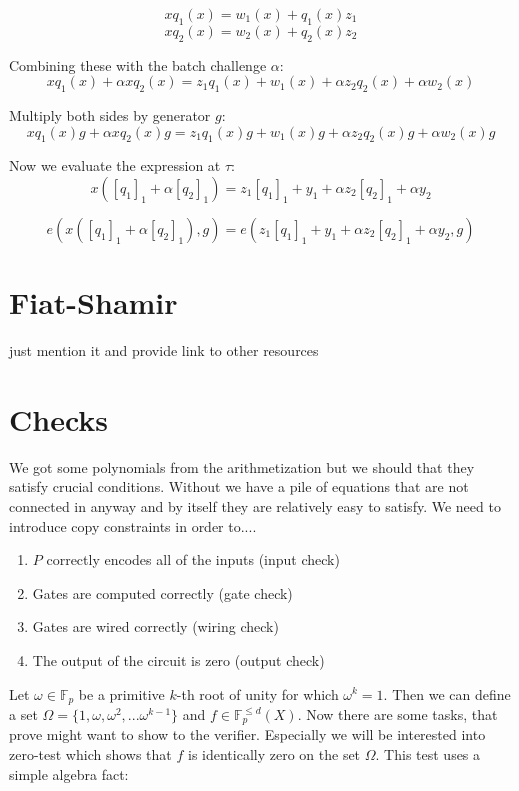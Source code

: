 $$x q_1(x) = w_1(x) + q_1(x)z_1$$
$$x q_2(x) = w_2(x) + q_2(x)z_2$$

Combining these with the batch challenge $\alpha$:
$$xq_1(x) + \alpha x q_2(x) = z_1q_1(x) + w_1(x) + \alpha z_2 q_2(x) + \alpha w_2(x)$$

Multiply both sides by generator $g$:
$$xq_1(x)g + \alpha x q_2(x)g = z_1q_1(x)g + w_1(x)g + \alpha z_2 q_2(x)g + \alpha w_2(x)g$$

Now we evaluate the expression at $\tau$:
$$x([q_1]_1 + \alpha [q_2]_1) = z_1[q_1]_1 + y_1 + \alpha z_2 [q_2]_1 + \alpha y_2$$

$$e(x([q_1]_1 + \alpha [q_2]_1), g) = e(z_1[q_1]_1 + y_1 + \alpha z_2 [q_2]_1 + \alpha y_2, g)$$



\section{Fiat-Shamir}
just mention it and provide link to other resources
 
\section{Checks}
We got some polynomials from the arithmetization but we should that they satisfy crucial conditions. Without we have a pile of equations that are not connected in anyway and by itself they are relatively easy to satisfy. We need to introduce copy constraints in order to....

\begin{enumerate}
    \item $P$ correctly encodes all of the inputs (input check)
    \item Gates are computed correctly (gate check)
    \item Gates are wired correctly (wiring check)
    \item The output of the circuit is zero (output check)
\end{enumerate}


Let $\omega \in \mathbb{F}_p$ be a primitive $k$-th root of unity for which $\omega^k = 1$. Then we can define a set $\Omega = \{1, \omega, \omega^2, ... \omega^{k-1}\}$ and $f \in \mathbb{F}_p^{\leq d} (X)$. Now there are some tasks, that prove might want to show to the verifier. Especially we will be interested into zero-test which shows that $f$ is identically zero on the set $\Omega$. This test uses a simple algebra fact:

